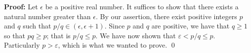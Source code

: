 \begin{enumerate}
      \textbf{Proof:} Let $\epsilon$ be a positive real number. It suffices to
      show that there exists a natural number greater than $\epsilon$. By our
      assertion, there exist positive integers $p$ and $q$ such that
      $p/q \in (\epsilon, \epsilon + 1)$. Since $p$ and $q$ are positive, we 
      have that $q \ge 1$ so that $pq \ge p$; that is $p/q \le p$. We have now
      shown that $\varepsilon < p/q \le p$. Particularly $p > \varepsilon$,
      which is what we wanted to prove. \qed

      
\end{enumerate}
